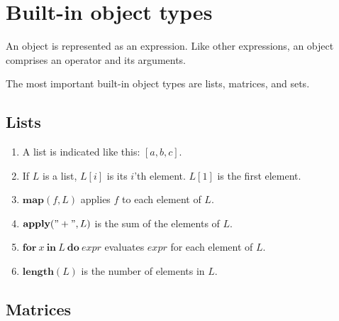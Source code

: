 \documentclass[12pt]{article}
\begin{document}
\section{Built-in object types}

An object is represented as an expression.
Like other expressions, an object comprises an operator and its arguments.

The most important built-in object types are lists, matrices, and sets.

\subsection{Lists}

\begin{enumerate}

\item A list is indicated like this: $[a, b, c]$.

\item If $L$ is a list, $L[i]$ is its $i$'th element. $L[1]$ is the first element.

\item $\mathbf{map}(\mathit{f}, L)$ applies $\mathit{f}$ to each element of $L$.

\item $\mathbf{apply}(\mathbf{"+"}, L)$ is the sum of the elements of $L$.

\item $\mathbf{for\ } x \mathbf{\ in \ } L \mathbf{\ do \ } \mathit{expr}$
    evaluates $\mathit{expr}$ for each element of $L$.

\item $\mathbf{length}(L)$ is the number of elements in $L$.

\end{enumerate}

\subsection{Matrices}
\end{document}
